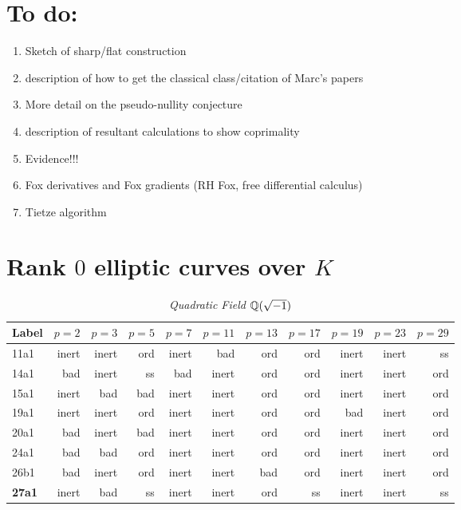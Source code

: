 \documentclass[a4paper,11pt]{article}
\numberwithin{equation}{section}
\begin{document}
\section*{To do:}

\begin{enumerate}\setlength{\itemsep}{-2pt}
    \item Sketch of sharp/flat construction
    \item description of how to get the classical class/citation of Marc's papers
    \item More detail on the pseudo-nullity conjecture
    \item description of resultant calculations to show coprimality
    \item Evidence!!!
    \item Fox derivatives and Fox gradients (RH Fox, free differential calculus)
    \item Tietze algorithm
\end{enumerate}


\appendix

\section{Rank $0$ elliptic curves over $K$}

\begin{table}[H]	\caption{\label{table:ordinary}\emph{Quadratic Field $\mathbb{Q}(\sqrt{-1})$}}
\begin{tabular}[t]{lrrrrrrrrrr}
	\toprule
Label   &  $p=2$ & $p=3$ & $p=5$ & $p=7$ & $p=11$ & $p=13$ & $p=17$ & $p=19$ & $p=23$ & $p=29$              \\ \midrule 11a1&inert&inert&ord&inert&bad &ord&ord&inert&inert&ss\\ \midrule 14a1&bad &inert&ss&bad &inert&ord&ord&inert&inert&ord\\ \midrule 15a1&inert&bad &bad &inert&inert&ord&ord&inert&inert&ord\\ \midrule 19a1&inert&inert&ord&inert&inert&ord&ord&bad &inert&ord\\ \midrule 20a1&bad &inert&bad &inert&inert&ord&ord&inert&inert&ord\\ \midrule 24a1&bad &bad &ord&inert&inert&ord&ord&inert&inert&ord\\ \midrule 26b1&bad &inert&ord&inert&inert&bad &ord&inert&inert&ord\\ \midrule \textbf{27a1} &inert&bad &ss&inert&inert&ord&ss&inert&inert&ss \\
\bottomrule
\end{tabular}
\end{table}
\end{document}
